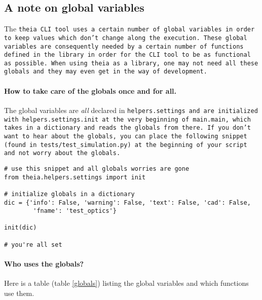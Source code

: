 \documentclass{article}
\begin{document}
\subsection{A note on global variables}
The \tt{theia} CLI tool uses a certain number of global variables in order to keep values which don't change along the execution. These global variables are consequently needed by a certain number of functions defined in the library in order for the CLI tool to be as functional as possible. When using \tt{theia} as a library, one may not need all these globals and they may even get in the way of development.

\paragraph{How to take care of the globals once and for all.}The global variables are \textit{all} declared in \tt{helpers.settings} and are initialized with \tt{helpers.settings.init} at the very beginning of \tt{main.main}, which takes in a dictionary and reads the globals from there. If you don't want to hear about the globals, you can place the following snippet (found in \tt{tests/test\_simulation.py}) at the beginning of your script and not worry about the globals.

\begin{lstlisting}
# use this snippet and all globals worries are gone
from theia.helpers.settings import init

# initialize globals in a dictionary
dic = {'info': False, 'warning': False, 'text': False, 'cad': False,
		'fname': 'test_optics'}

init(dic)

# you're all set
\end{lstlisting}

\paragraph{Who uses the globals?}Here is a table (table \ref{globals}) listing the global variables and which functions use them.
\end{document}
